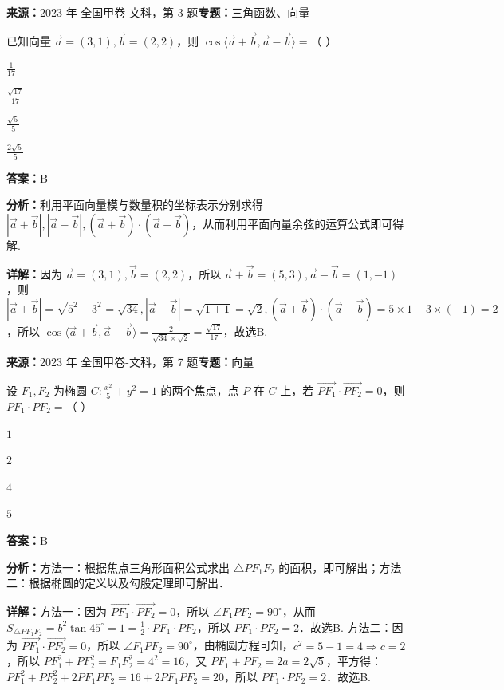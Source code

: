\begin{question}[points=5]
\textbf{来源：}2023 年 全国甲卷-文科，第 3 题\quad \textbf{专题：}三角函数、向量\par
已知向量 $\vec{a} = (3,1), \vec{b} = (2,2)$，则 $\cos\langle \vec{a}+\vec{b}, \vec{a}-\vec{b} \rangle =$（    ）
\begin{choices}
  \item $\frac{1}{17}$
  \item $\frac{\sqrt{17}}{17}$
  \item $\frac{\sqrt{5}}{5}$
  \item $\frac{2\sqrt{5}}{5}$
\end{choices}
\begin{solution}
\textbf{答案：}B

\textbf{分析：}利用平面向量模与数量积的坐标表示分别求得 $|\vec{a}+\vec{b}|, |\vec{a}-\vec{b}|, (\vec{a}+\vec{b})\cdot(\vec{a}-\vec{b})$，从而利用平面向量余弦的运算公式即可得解.

\textbf{详解：}因为 $\vec{a} = (3,1), \vec{b} = (2,2)$，所以 $\vec{a}+\vec{b} = (5,3), \vec{a}-\vec{b} = (1,-1)$，则 $|\vec{a}+\vec{b}| = \sqrt{5^2+3^2} = \sqrt{34}, |\vec{a}-\vec{b}| = \sqrt{1+1} = \sqrt{2}, (\vec{a}+\vec{b})\cdot(\vec{a}-\vec{b}) = 5\times1+3\times(-1)=2$，所以 $\cos\langle \vec{a}+\vec{b}, \vec{a}-\vec{b} \rangle = \frac{2}{\sqrt{34}\times\sqrt{2}} = \frac{\sqrt{17}}{17}$，故选B.
\end{solution}
\end{question}

\begin{question}[points=5]
\textbf{来源：}2023 年 全国甲卷-文科，第 7 题\quad \textbf{专题：}向量\par
设 $F_1, F_2$ 为椭圆 $C: \frac{x^2}{5}+y^2=1$ 的两个焦点，点 $P$ 在 $C$ 上，若 $\overrightarrow{PF_1} \cdot \overrightarrow{PF_2}=0$，则 $PF_1 \cdot PF_2 =$（    ）
\begin{choices}
  \item $1$
  \item $2$
  \item $4$
  \item $5$
\end{choices}
\begin{solution}
\textbf{答案：}B

\textbf{分析：}方法一：根据焦点三角形面积公式求出 $\triangle PF_1F_2$ 的面积，即可解出；方法二：根据椭圆的定义以及勾股定理即可解出．

\textbf{详解：}方法一：因为 $\overrightarrow{PF_1} \cdot \overrightarrow{PF_2}=0$，所以 $\angle F_1PF_2=90^\circ$，从而 $S_{\triangle PF_1F_2} = b^2\tan45^\circ = 1 = \frac{1}{2} \cdot PF_1 \cdot PF_2$，所以 $PF_1 \cdot PF_2 = 2$．故选B.
方法二：因为 $\overrightarrow{PF_1} \cdot \overrightarrow{PF_2}=0$，所以 $\angle F_1PF_2=90^\circ$，由椭圆方程可知，$c^2=5-1=4 \Rightarrow c=2$，所以 $PF_1^2+PF_2^2 = F_1F_2^2 = 4^2=16$，又 $PF_1+PF_2=2a=2\sqrt{5}$，平方得：$PF_1^2+PF_2^2+2PF_1PF_2=16+2PF_1PF_2=20$，所以 $PF_1 \cdot PF_2=2$．故选B.
\end{solution}
\end{question}

